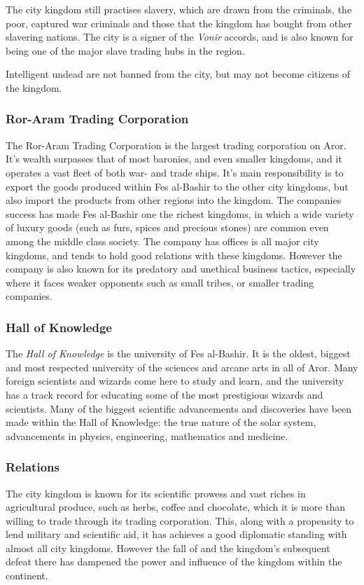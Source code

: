The city kingdom still practises slavery, which are drawn from the criminals,
the poor, captured war criminals and those that the kingdom has bought from
other slavering nations. The city is a signer of the \emph{Vonir} accords, and
is also known for being one of the major slave trading hubs in the region.

Intelligent undead are not banned from the city, but may not become citizens
of the kingdom.

\subsubsection*{Ror-Aram Trading Corporation}
\label{sec:Ror-Aram Trading Corporation}

The Ror-Aram Trading Corporation is the largest trading corporation on Aror.
It's wealth surpasses that of most baronies, and even smaller kingdoms, and it
operates a vast fleet of both war- and trade ships. It's main responsibility is
to export the goods produced within Fes al-Bashir to the other city kingdoms,
but also import the products from other regions into the kingdom. The
companies success has made Fes al-Bashir one the richest kingdoms, in which a
wide variety of luxury goods (such as furs, spices and precious stones) are
common even among the middle class society. The company has offices is all
major city kingdoms, and tends to hold good relations with these
kingdoms. However the company is also known for its predatory and unethical
business tactics, especially where it faces weaker opponents such as small
tribes, or smaller trading companies.

\subsubsection*{Hall of Knowledge}
\label{sec:Hall of Knowledge}

The \emph{Hall of Knowledge} is the university of Fes al-Bashir. It is the
oldest, biggest and most respected university of the sciences and arcane arts
in all of Aror. Many foreign scientists and wizards come here to study and
learn, and the university has a track record for educating some of the most
prestigious wizards and scientists. Many of the biggest scientific
advancements and discoveries have been made within the Hall of Knowledge: the
true nature of the solar system, advancements in physics, engineering,
mathematics and medicine.

\subsubsection*{Relations}

The city kingdom is known for its scientific prowess and vast riches in
agricultural produce, such as herbs, coffee and chocolate, which it is more
than willing to trade through its trading corporation. This, along with a
propensity to lend military and scientific aid, it has achieves a good
diplomatic standing with almost all city kingdoms. However the fall of
 and the kingdom's subsequent defeat there has dampened
the power and influence of the kingdom within the continent.
